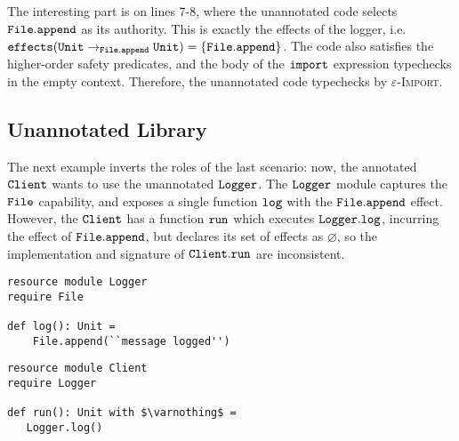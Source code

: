 The interesting part  is on lines 7-8, where the unannotated code selects $\mathtt{File.append}$ as its authority. This is exactly the effects of the logger, i.e. $\mathtt{effects}(\mathtt{Unit} \rightarrow_{\mathtt{File.append}} \mathtt{Unit}) = \{ \mathtt{File.append} \}$. The code also satisfies the higher-order safety predicates, and the body of the $\mathtt{import}$ expression typechecks in the empty context. Therefore, the unannotated code typechecks by \textsc{$\varepsilon$-Import}.









































\subsection{Unannotated Library}

The next example inverts the roles of the last scenario: now, the annotated $\mathtt{Client}$ wants to use the unannotated $\mathtt{Logger}$. The $\mathtt{Logger}$ module captures the $\mathtt{File}$ capability, and exposes a single function $\mathtt{log}$ with the $\mathtt{File.append}$ effect. However, the $\mathtt{Client}$ has a function $\mathtt{run}$ which executes $\mathtt{Logger.log}$, incurring the effect of $\mathtt{File.append}$, but declares its set of effects as $\varnothing$, so the implementation and signature of $\mathtt{Client.run}$ are inconsistent.

\begin{lstlisting}
resource module Logger
require File

def log(): Unit =
    File.append(``message logged'')
\end{lstlisting}

\begin{lstlisting}
resource module Client
require Logger

def run(): Unit with $\varnothing$ =
   Logger.log()
\end{lstlisting}

